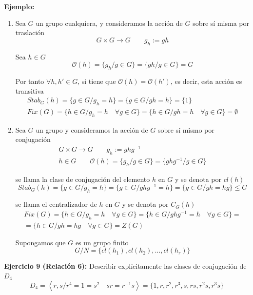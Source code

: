 \documentclass{article}
\begin{document}
\textbf{Ejemplo:} 
\begin{enumerate}[1)]
\item Sea $G$ un grupo cualquiera, y consideramos la acción de $G$ sobre sí misma por traslación 
\begin{equation*}
G\times G\longrightarrow G \qquad g_h:=gh
\end{equation*}

Sea $h\in G$
\begin{equation*}
\mathcal{O}(h)=\{g_h/g\in G\}=\{gh/g\in G\}=G
\end{equation*}

Por tanto $\forall h,h'\in G$, si tiene que $\mathcal{O}(h)=\mathcal{O}(h')$, es decir, esta acción es transitiva
\begin{gather*}
Stab_G(h)=\{g\in G/g_h=h\}=\{g\in G/gh=h\}=\{1\} \\
Fix(G)=\{h\in G/g_h=h\quad \forall g\in G\}=\{h\in G/gh=h\quad \forall g\in G\}=\emptyset
\end{gather*}

\item Sea $G$ un grupo y consideramos la acción de $G$ sobre sí mismo por conjugación 
\begin{gather*}
G\times G\longrightarrow G \qquad g_h:=ghg^{-1} \\
h\in G\qquad \mathcal{O}(h)=\{g_h/g\in G\}=\{ghg^{-1}/g\in G\}
\end{gather*}

se llama la clase de conjugación del elemento $h$ en $G$ y se denota por $cl(h)$
\begin{equation*}
Stab_G(h)=\{g\in G/g_h=h\}=\{g\in G/ghg^{-1}=h\}=\{g\in G/gh=hg\}\leq G
\end{equation*}

se llama el centralizador de $h$ en $G$ y se denota por $C_G(h)$
\begin{gather*}
Fix(G)=\{h\in G/g_h=h\quad \forall g\in G\}=\{h\in G/ghg^{-1}=h\quad \forall g\in G\}=\\
=\{h\in G/gh=hg\quad \forall g\in G\}=Z(G)
\end{gather*}

Supongamos que $G$ es un grupo finito
\begin{equation*}
G/N=\{cl(h_1),cl(h_2),\ldots,cl(h_r)\}
\end{equation*}
\end{enumerate}

\textbf{Ejercicio 9 (Relación 6):} Describir explícitamente las clases de conjugación de $D_4$
\begin{equation*}
D_4=\left\langle r,s/r^4=1=s^2\quad sr=r^{-1}s\right\rangle=\{1,r,r^2,r^3,s,rs,r^2s,r^3s\}
\end{equation*}
\end{document}
